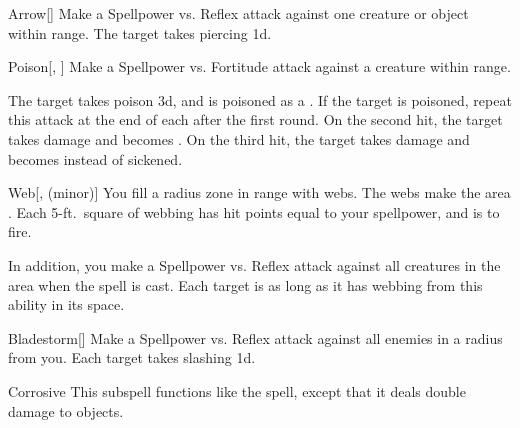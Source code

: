 \begin{ability}[\nth{2}]{Arrow}[]
Make a Spellpower vs. Reflex attack against one creature or object within \rnglong range.
\hit The target takes piercing  \plus1d.
\end{ability}
\vspace{0.25em}


\begin{ability}[\nth{2}]{Poison}[, ]
Make a Spellpower vs. Fortitude attack against a creature within \rngmed range.

\hit The target takes poison  \minus3d, and is poisoned as a .
If the target is poisoned, repeat this attack at the end of each  after the first round.
On the second hit, the target takes damage and becomes .
On the third hit, the target takes damage and becomes  instead of sickened.
\end{ability}
\vspace{0.25em}


\begin{ability}[\nth{2}]{Web}[,  (minor)]
You fill a \areasmall radius zone in \rngclose range with webs.
The webs make the area .
Each 5-ft.\ square of webbing has hit points equal to your spellpower, and is  to fire.

In addition, you make a Spellpower vs. Reflex attack against all creatures in the area when the spell is cast.
\hit Each target is \immobilized as long as it has webbing from this ability in its space.
\end{ability}
\vspace{0.25em}


\begin{ability}[\nth{3}]{Bladestorm}[]
Make a Spellpower vs. Reflex attack against all enemies in a \areasmall radius from you.
\hit Each target takes slashing  \minus1d.
\end{ability}
\vspace{0.25em}


\begin{ability}[\nth{3}]{Corrosive}
This subspell functions like the  spell, except that it deals double damage to objects.
\end{ability}
\vspace{0.25em}



